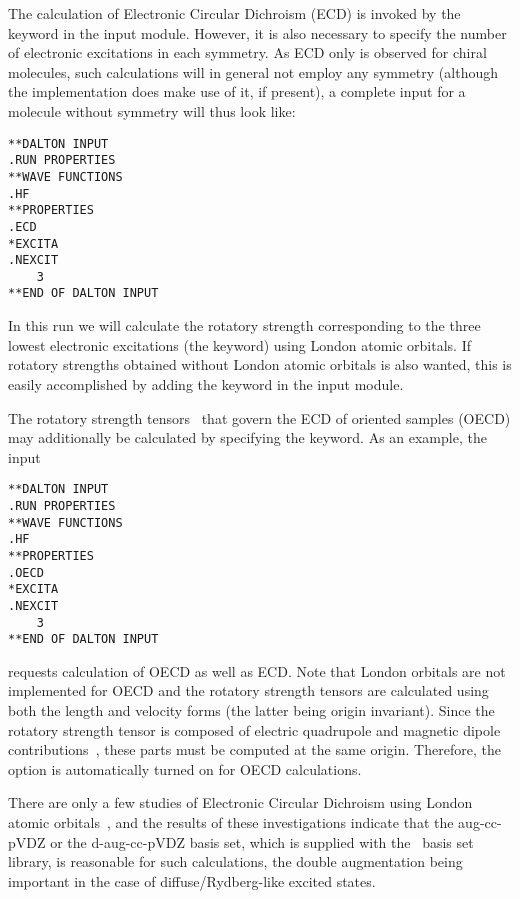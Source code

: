 The calculation of Electronic Circular Dichroism
(ECD) is invoked by the
keyword  in the  input module. However, it is
also necessary to specify the number of electronic
excitations in each symmetry. As ECD only
is observed for chiral molecules, such calculations will in general not
employ any symmetry (although the implementation does make use of it,
if present), a complete input for a molecule without symmetry will thus
look like:

\begin{verbatim}
**DALTON INPUT
.RUN PROPERTIES
**WAVE FUNCTIONS
.HF
**PROPERTIES
.ECD
*EXCITA
.NEXCIT
    3
**END OF DALTON INPUT
\end{verbatim}

In this run we will calculate the rotatory strength
corresponding to
the three lowest electronic excitations
(the  keyword)
using London atomic orbitals.
If rotatory strengths obtained without London atomic orbitals is also
wanted, this is easily accomplished by adding the keyword
 in the  input module.

The rotatory strength tensors~\cite{tbpaehcpl246}
that govern the ECD of oriented samples
(OECD) may additionally be
calculated by specifying the  keyword. As an example,
the input

\begin{verbatim}
**DALTON INPUT
.RUN PROPERTIES
**WAVE FUNCTIONS
.HF
**PROPERTIES
.OECD
*EXCITA
.NEXCIT
    3
**END OF DALTON INPUT
\end{verbatim}
requests calculation of OECD as well as ECD. Note that London orbitals
are not implemented for OECD and the rotatory strength tensors are
calculated using both the length and velocity forms (the latter being
origin invariant). Since the rotatory strength tensor is composed of
electric quadrupole and magnetic dipole
contributions~\cite{tbpaehcpl246}, these parts must be computed at the
same origin. Therefore, the  option is automatically turned
on for OECD calculations.

There are only a few studies of Electronic Circular
Dichroism using London atomic
orbitals~\cite{klbaehkrthjopjtca90,mpkrthcpl388}, and the results of
these investigations indicate that the aug-cc-pVDZ or the d-aug-cc-pVDZ
basis set, which is supplied with the \dalton\ basis set library, is
reasonable for such calculations, the double augmentation being
important in the case of diffuse/Rydberg-like excited states.

